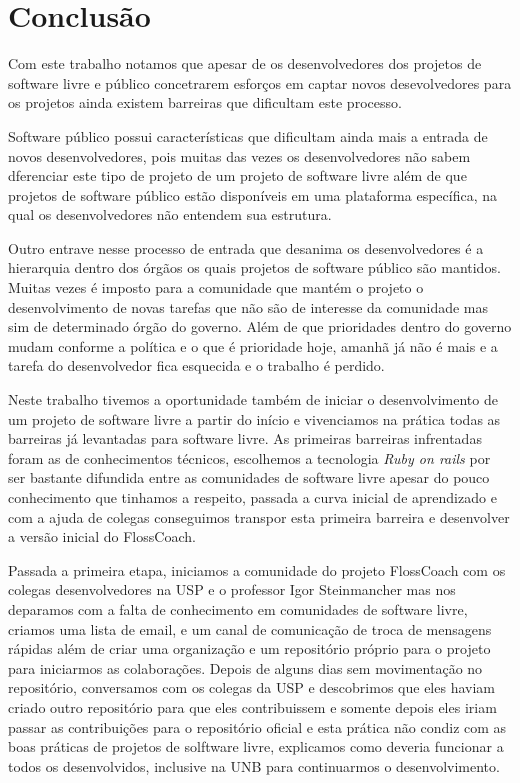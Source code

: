 \chapter{Conclusão}
\label{conclusao}

Com este trabalho notamos que apesar de os desenvolvedores dos projetos de software
livre e público concetrarem esforços em captar novos desevolvedores para os 
projetos ainda existem barreiras que dificultam este processo. 

Software público possui características que dificultam ainda mais a entrada de 
novos desenvolvedores, pois muitas das vezes os desenvolvedores não sabem 
dferenciar este tipo de projeto de um projeto de software livre além de que
projetos de software público estão disponíveis em uma plataforma específica,
na qual os desenvolvedores não entendem sua estrutura.

Outro entrave nesse processo de entrada que desanima os desenvolvedores
é a hierarquia dentro dos órgãos os quais projetos de software público são 
mantidos. Muitas vezes é imposto para a comunidade que mantém o projeto
o desenvolvimento de novas tarefas que não são de interesse da comunidade
mas sim de determinado órgão do governo. Além de que prioridades dentro do
governo mudam conforme a política e o que é prioridade hoje, amanhã já não é mais
e a tarefa do desenvolvedor fica esquecida e o trabalho é perdido.

Neste trabalho tivemos a oportunidade também de iniciar o desenvolvimento de um
projeto de software livre a partir do início e vivenciamos na prática todas as barreiras
já levantadas para software livre. As primeiras barreiras infrentadas foram as de
conhecimentos técnicos, escolhemos a tecnologia \textit{Ruby on rails} por ser
bastante difundida entre as comunidades de software livre apesar do pouco conhecimento
que tinhamos a respeito, passada a curva inicial de aprendizado e com a ajuda de 
colegas conseguimos transpor esta primeira barreira e desenvolver a versão inicial 
do FlossCoach.

Passada a primeira etapa, iniciamos a comunidade do projeto FlossCoach com os colegas
desenvolvedores na USP e o professor Igor Steinmancher mas nos deparamos com a 
falta de conhecimento em comunidades de software livre, criamos uma lista de email,
e um canal de comunicação de troca de mensagens rápidas além de criar uma organização
e um repositório próprio para o projeto para iniciarmos as colaborações.
Depois de alguns dias sem movimentação no repositório, conversamos com os colegas
da USP e descobrimos que eles haviam criado outro repositório para que eles contribuissem
e somente depois eles iriam passar as contribuições para o repositório oficial e esta
prática não condiz com as boas práticas de projetos de solftware livre, explicamos 
como deveria funcionar a todos os desenvolvidos, inclusive na UNB para continuarmos
o desenvolvimento.

